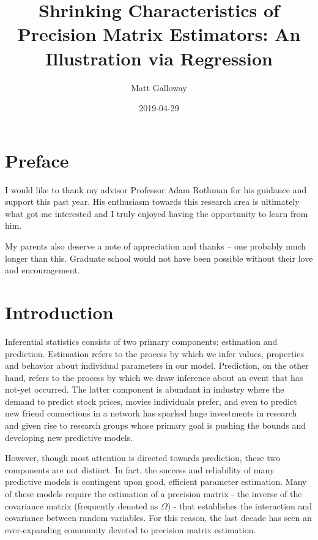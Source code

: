 \documentclass[11pt,]{report}
\title{Shrinking Characteristics of Precision Matrix Estimators: An Illustration via Regression}
\author{Matt Galloway}
\date{2019-04-29}
\theoremstyle{definition}
\theoremstyle{definition}
\theoremstyle{definition}
\theoremstyle{remark}
\begin{document}
\maketitle

{
\hypersetup{linkcolor=}
\setcounter{tocdepth}{1}
\tableofcontents
}
\hypertarget{preface}{%
\chapter*{Preface}\label{preface}}


I would like to thank my advisor Professor Adam Rothman for his guidance and support this past year. His enthusiasm towards this research area is ultimately what got me interested and I truly enjoyed having the opportunity to learn from him.

My parents also deserve a note of appreciation and thanks -- one probably much longer than this. Graduate school would not have been possible without their love and encouragement.

\hypertarget{intro}{%
\chapter{Introduction}\label{intro}}

Inferential statistics consists of two primary components: estimation and prediction. Estimation refers to the process by which we infer values, properties and behavior about individual parameters in our model. Prediction, on the other hand, refers to the process by which we draw inference about an event that has not-yet occurred. The latter component is abundant in industry where the demand to predict stock prices, movies individuals prefer, and even to predict new friend connections in a network has sparked huge investments in research and given rise to research groups whose primary goal is pushing the bounds and developing new predictive models.

However, though most attention is directed towards prediction, these two components are not distinct. In fact, the success and reliability of many predictive models is contingent upon good, efficient parameter estimation. Many of these models require the estimation of a precision matrix - the inverse of the covariance matrix (frequently denoted as \(\Omega\)) - that establishes the interaction and covariance between random variables. For this reason, the last decade has seen an ever-expanding community devoted to precision matrix estimation.
\end{document}

